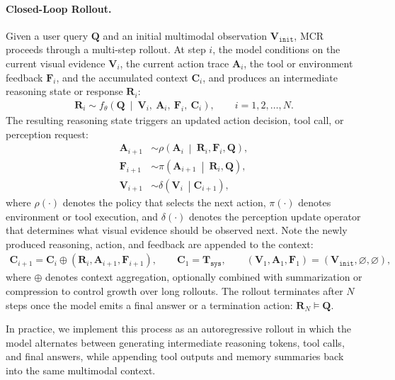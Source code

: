 \documentclass[11pt, letterpaper]{template}
\theoremstyle{plain}
\theoremstyle{definition}
\theoremstyle{remark}
\begin{document}
\paragraph{Closed-Loop Rollout.}
Given a user query $\mathbf{Q}$ and an initial multimodal observation $\mathbf{V}_{\texttt{init}}$, MCR proceeds through a multi-step rollout. At step $i$, the model conditions on the current visual evidence $\mathbf{V}_i$, the current action trace $\mathbf{A}_i$, the tool or environment feedback $\mathbf{F}_i$, and the accumulated context $\mathbf{C}_i$, and produces an intermediate reasoning state or response $\mathbf{R}_i$:
\begin{align}
\mathbf{R}_i \sim f_{\theta}\!\left(\mathbf{Q}\ \middle|\ \mathbf{V}_i,\ \mathbf{A}_i,\ \mathbf{F}_i,\ \mathbf{C}_i\right), \qquad i = 1,2,\dots,N .
\label{eq:mcr_main_rewrite}
\end{align}
The resulting reasoning state triggers an updated action decision, tool call, or perception request:
\begin{align}
\mathbf{A}_{i+1} &\sim \rho\!\left(\mathbf{A}_i\ \middle|\ \mathbf{R}_i,\mathbf{F}_i,\mathbf{Q}\right), \\
\mathbf{F}_{i+1} &\sim \pi\!\left(\mathbf{A}_{i+1}\ \middle|\ \mathbf{R}_i,\mathbf{Q}\right), \\
\mathbf{V}_{i+1} &\sim \delta\!\left(\mathbf{V}_i\ \middle|\mathbf{C}_{i+1}\right),
\label{eq:mcr_transition_rewrite}
\end{align}
where $\rho(\cdot)$ denotes the policy that selects the next action, $\pi(\cdot)$ denotes environment or tool execution, and $\delta(\cdot)$ denotes the perception update operator that determines what visual evidence should be observed next. Note the newly produced reasoning, action, and feedback are appended to the context:
\begin{align}
\mathbf{C}_{i+1} = \mathbf{C}_i \oplus \left(\mathbf{R}_i,\mathbf{A}_{i+1},\mathbf{F}_{i+1}\right),
\qquad
\mathbf{C}_1 = \mathbf{T}_{\texttt{sys}},
\qquad
(\mathbf{V}_1,\mathbf{A}_1,\mathbf{F}_1)=(\mathbf{V}_{\texttt{init}},\varnothing,\varnothing),
\label{eq:mcr_context_rewrite}
\end{align}
where $\oplus$ denotes context aggregation, optionally combined with summarization or compression to control growth over long rollouts. The rollout terminates after $N$ steps once the model emits a final answer or a termination action:
$\mathbf{R}_N \models \mathbf{Q}$.

In practice, we implement this process as an autoregressive rollout in which the model alternates between generating intermediate reasoning tokens, tool calls, and final answers, while appending tool outputs and memory summaries back into the same multimodal context.
\end{document}

